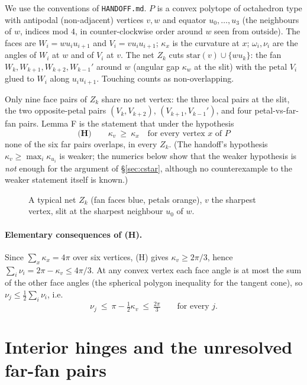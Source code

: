 \documentclass[11pt]{article}
\theoremstyle{definition}
\theoremstyle{remark}
\begin{document}
We use the conventions of \texttt{HANDOFF.md}. $P$ is a convex polytope of octahedron type with antipodal
(non-adjacent) vertices $v,w$ and equator $u_0,\dots,u_3$ (the neighbours of $w$, indices mod $4$, in
counter-clockwise order around $w$ seen from outside). The faces are $W_i=w u_i u_{i+1}$ and
$V_i=v u_i u_{i+1}$; $\kappa_x$ is the curvature at $x$; $\omega_i,\nu_i$ are the angles of $W_i$ at $w$ and of
$V_i$ at $v$. The net $Z_k$ cuts $\mathrm{star}(v)\cup\{wu_k\}$: the fan $W_k,W_{k+1},W_{k+2},W_{k-1}'$
around $w$ (angular gap $\kappa_w$ at the slit) with the petal $V_i$ glued to $W_i$ along $u_iu_{i+1}$.
Touching counts as non-overlapping.

Only nine face pairs of $Z_k$ share no net vertex: the three local pairs at the slit, the two opposite-petal
pairs $(V_k,V_{k+2})$, $(V_{k+1},V_{k-1}')$, and four petal-vs-far-fan pairs. Lemma F is the statement
that under the hypothesis
\begin{equation}\label{H3}
 \textbf{(H)}\qquad \kappa_v\ \ge\ \kappa_x \quad\text{for every vertex } x \text{ of } P
\end{equation}
none of the six far pairs overlaps, in every $Z_k$. (The handoff's hypothesis $\kappa_v\ge\max_i\kappa_{u_i}$
is weaker; the numerics below show that the weaker hypothesis is \emph{not} enough for the argument of
\S\ref{sec:cstar}, although no counterexample to the weaker statement itself is known.)

\begin{figure}[h]\centering
\resizebox{0.9\linewidth}{!}{}
\caption{A typical net $Z_k$ (fan faces blue, petals orange), $v$ the sharpest vertex, slit at the sharpest
neighbour $u_0$ of $w$.}
\end{figure}

\paragraph{Elementary consequences of (H).}
Since $\sum_x\kappa_x=4\pi$ over six vertices, (H) gives $\kappa_v\ge 2\pi/3$, hence
$\sum_i\nu_i=2\pi-\kappa_v\le 4\pi/3$. At any convex vertex each face angle is at most the sum of the other
face angles (the spherical polygon inequality for the tangent cone), so $\nu_j\le\frac12\sum_i\nu_i$, i.e.
\begin{equation}\label{numax}
 \nu_j\ \le\ \pi-\tfrac12\kappa_v\ \le\ \tfrac{2\pi}{3}\qquad\text{for every } j .
\end{equation}

\section{Interior hinges and the unresolved far-fan pairs}
\end{document}

